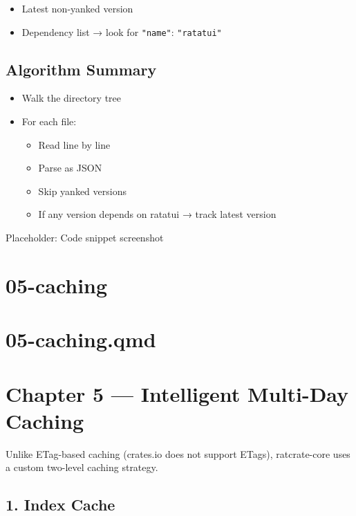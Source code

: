 \documentclass[
  letterpaper,
  DIV=11,
  numbers=noendperiod]{scrreprt}
\providecommand{\tightlist}{%
  \setlength{\itemsep}{0pt}\setlength{\parskip}{0pt}}
\begin{document}
\begin{itemize}
\item
  Latest non-yanked version
\item
  Dependency list → look for \texttt{"name"}: \texttt{"ratatui"}
\end{itemize}

\section{Algorithm Summary}\label{algorithm-summary}

\begin{itemize}
\item
  Walk the directory tree
\item
  For each file:

  \begin{itemize}
  \tightlist
  \item
    Read line by line
  \item
    Parse as JSON
  \item
    Skip yanked versions
  \item
    If any version depends on ratatui → track latest version
  \end{itemize}
\end{itemize}

Placeholder: Code snippet screenshot

\chapter{05-caching}\label{caching}

\chapter{05-caching.qmd}\label{caching.qmd}

\chapter{Chapter 5 --- Intelligent Multi-Day
Caching}\label{chapter-5-intelligent-multi-day-caching}

Unlike ETag-based caching (crates.io does not support ETags),
ratcrate-core uses a custom two-level caching strategy.

\section{1. Index Cache}\label{index-cache}
\end{document}
